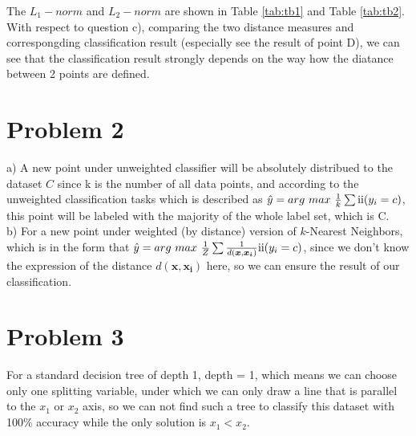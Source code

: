 \documentclass{article}
\begin{document}
The $L_1-norm$ and $L_2-norm$ are shown in Table \ref{tab:tb1} and Table \ref{tab:tb2}. With respect to question c), comparing the two distance measures and correspongding classification result (especially see the result of point D), we can see that the classification result strongly depends on the way how the diatance between 2 points are defined.

\section*{Problem 2}
a) A new point under unweighted classifier will be absolutely distribued to the dataset $C$ since k is the number of all data points, and according to the unweighted classification tasks which is described as $\hat{y} = arg\ max\ \frac{1}{k} \sum \mathrm{\uppercase\expandafter{\romannumeral2}} (y_i = c) $, this point will be labeled with the majority of the whole label set, which is C.\\

b) For a new point under weighted (by distance) version of $k$-Nearest Neighbors, which is in the form that $\hat{y} = arg\ max\ \frac{1}{Z} \sum \frac{1}{d(\bm{x}, \bm{x_i})} \mathrm{\uppercase\expandafter{\romannumeral2}} (y_i = c) $, since we don't know the expression of the distance $d(\bm{x}, \bm{x_i})$ here, so we can ensure the result of our classification.
\section*{Problem 3}
For a standard decision tree of depth 1, depth = 1, which means we can choose only one splitting variable, under which we can only draw a line that is parallel to the $x_1$ or $x_2$ axis, so we can not find such a tree to classify this dataset with 100\% accuracy while the only solution is $x_1 < x_2$.
\end{document}
